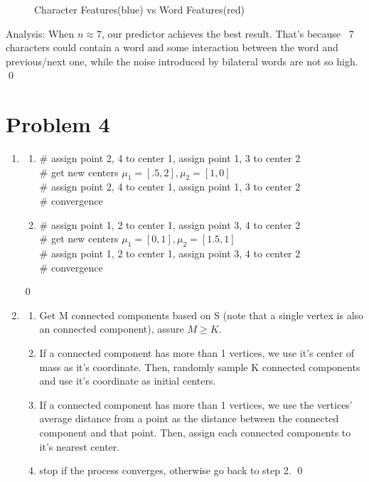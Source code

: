 \documentclass[12pt]{article}
\begin{document}
\begin{enumerate}[label=(\alph*)]
\begin{figure}
          \caption{Character Features(blue) vs Word Features(red)}
      \end{figure}
      Analysis: When $n \approx 7$, our predictor achieves the best result. That's because ~7 characters could contain a word and some interaction between the word and previous/next one, while the noise introduced by bilateral words are not so high. \qed
      
\end{enumerate}

\section*{Problem 4}    
\begin{enumerate}[label=(\alph*)]
  \item 
    \begin{enumerate}[label=\arabic*.]
        \item
        \# assign point 2, 4 to center 1, assign point 1, 3 to center 2 \\
        \# get new centers $ \mu_1 = [.5, 2], \mu_2=[1, 0]$ \\
        \# assign point 2, 4 to center 1, assign point 1, 3 to center 2 \\
        \# convergence
        \item
        \# assign point 1, 2 to center 1, assign point 3, 4 to center 2 \\
        \# get new centers $ \mu_1 = [0, 1], \mu_2=[1.5, 1]$ \\
        \# assign point 1, 2 to center 1, assign point 3, 4 to center 2 \\
        \# convergence
    \end{enumerate}\qed
  \setcounter{enumi}{2}
  \item
    \begin{enumerate}[label=\arabic*.]
      \item Get M connected components based on S (note that a single vertex is also an connected component), assure $M \ge K$.
      \item If a connected component has more than 1 vertices, we use it's center of mass as it's coordinate. Then, randomly sample K connected components and use it's coordinate as initial centers.
      \item If a connected component has more than 1 vertices, we use the vertices' average distance from a point as the distance between the connected component and that point. Then, assign each connected components to it's nearest center.
      \item stop if the process converges, otherwise go back to step 2. \qed
    \end{enumerate}
\end{enumerate}
\end{document}
